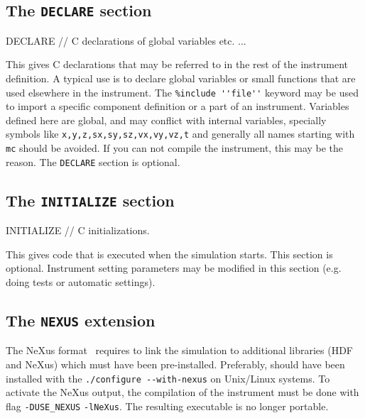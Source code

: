\subsection{The \texttt{DECLARE} section}
\label{s:declare}

\begin{mcstas}
DECLARE
   // C declarations of global variables etc. ...
\end{mcstas} 
 This gives C declarations that may be
referred to in the rest of the instrument definition. A typical use is to
declare global variables or small functions that are used elsewhere in the
instrument. The \verb+%include ''file''+ keyword may be used to import a
specific
component definition or a part of an instrument. Variables defined here are
global, and may conflict with internal \MCS variables, specially symbols like
\verb+x,y,z,sx,sy,sz,vx,vy,vz,t+ and generally all names starting with \verb+mc+
should be avoided. If you can not compile the instrument, this may be the
reason. The \texttt{DECLARE} section is optional.

\subsection{The \texttt{INITIALIZE} section}
\label{s:initialize}

\begin{mcstas}
INITIALIZE
// C initializations. 
\end{mcstas} 
This gives code that is executed when the
simulation starts. This section is optional. Instrument setting parameters may
be modified in this section (e.g. doing tests or automatic settings).

\subsection{The \texttt{NEXUS} extension}
\label{s:nexus}

The NeXus format~\cite{nexus_webpage} requires to link the simulation to
additional libraries (HDF and NeXus) which must have been
pre-installed. Preferably, \MCS should have been installed with the
\verb+./configure --with-nexus+ on Unix/Linux systems. To activate the NeXus
output, the compilation of the instrument must be done with flag
\verb+-DUSE_NEXUS+ \verb+-lNeXus+.
The resulting executable is no longer portable.

